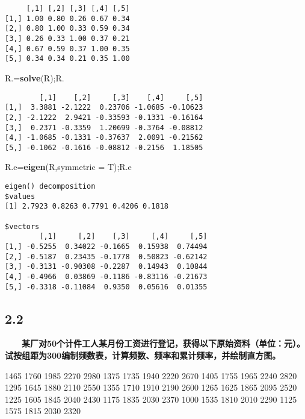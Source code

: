 \documentclass[
]{article}
\newenvironment{Shaded}{\begin{snugshade}}{\end{snugshade}}
\newcommand{\DataTypeTok}[1]{\textcolor[rgb]{0.13,0.29,0.53}{#1}}
\newcommand{\KeywordTok}[1]{\textcolor[rgb]{0.13,0.29,0.53}{\textbf{#1}}}
\newcommand{\NormalTok}[1]{#1}
\begin{document}
\begin{verbatim}
     [,1] [,2] [,3] [,4] [,5]
[1,] 1.00 0.80 0.26 0.67 0.34
[2,] 0.80 1.00 0.33 0.59 0.34
[3,] 0.26 0.33 1.00 0.37 0.21
[4,] 0.67 0.59 0.37 1.00 0.35
[5,] 0.34 0.34 0.21 0.35 1.00
\end{verbatim}

\begin{Shaded}
\begin{Highlighting}[]
\NormalTok{R.=}\KeywordTok{solve}\NormalTok{(R);R.       }
\end{Highlighting}
\end{Shaded}

\begin{verbatim}
        [,1]    [,2]     [,3]    [,4]     [,5]
[1,]  3.3881 -2.1222  0.23706 -1.0685 -0.10623
[2,] -2.1222  2.9421 -0.33593 -0.1331 -0.16164
[3,]  0.2371 -0.3359  1.20699 -0.3764 -0.08812
[4,] -1.0685 -0.1331 -0.37637  2.0091 -0.21562
[5,] -0.1062 -0.1616 -0.08812 -0.2156  1.18505
\end{verbatim}

\begin{Shaded}
\begin{Highlighting}[]
\NormalTok{R.e=}\KeywordTok{eigen}\NormalTok{(R,}\DataTypeTok{symmetric =}\NormalTok{ T);R.e    }
\end{Highlighting}
\end{Shaded}

\begin{verbatim}
eigen() decomposition
$values
[1] 2.7923 0.8263 0.7791 0.4206 0.1818

$vectors
        [,1]     [,2]    [,3]     [,4]     [,5]
[1,] -0.5255  0.34022 -0.1665  0.15938  0.74494
[2,] -0.5187  0.23435 -0.1778  0.50823 -0.62142
[3,] -0.3131 -0.90308 -0.2287  0.14943  0.10844
[4,] -0.4966  0.03869 -0.1186 -0.83116 -0.21673
[5,] -0.3318 -0.11084  0.9350  0.05616  0.01355
\end{verbatim}

\hypertarget{section-1}{%
\subsection{2.2}\label{section-1}}

　　\textbf{某厂对50个计件工人某月份工资进行登记，获得以下原始资料（单位：元）。试按组距为300编制频数表，计算频数、频率和累计频率，并绘制直方图。}

1465 1760 1985 2270 2980 1375 1735 1940 2220 2670 1405 1755 1965 2240
2820 1295 1645 1880 2110 2550 1355 1710 1910 2190 2600 1265 1625 1865
2095 2520 1225 1605 1845 2040 2430 1175 1835 2030 2370 1000 1535 1810
2010 2290 1125 1575 1815 2030 2320
\end{document}

